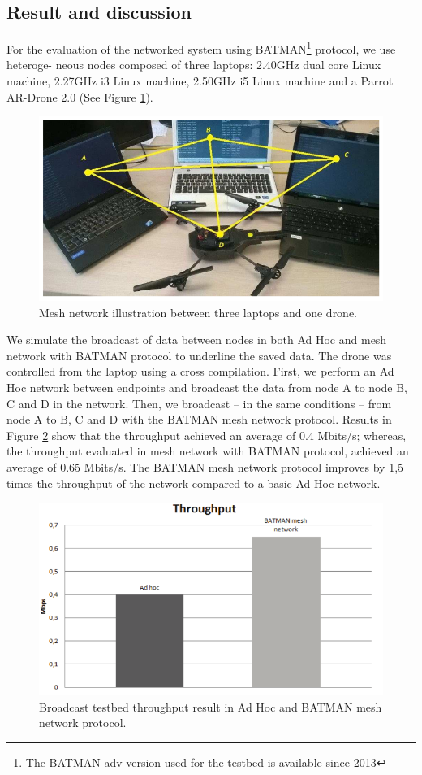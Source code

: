 \documentclass[11pt,openany]{book}
\begin{document}
\begin{algorimth}[H]
\subsection{Result and discussion}
For the evaluation of the networked system using BATMAN\footnote{The BATMAN-adv version used for the testbed is available since 2013} protocol, we use heteroge- neous nodes composed of three laptops: 2.40GHz dual core Linux machine, 2.27GHz i3 Linux machine, 2.50GHz i5 Linux machine and a Parrot AR-Drone 2.0 (See Figure \ref{fig:4.3}).
\begin{figure}[H]
    \centering
    \includegraphics[scale=0.3]{assets/4_3.png}
    \caption{Mesh network illustration between three laptops and one drone.}
    \label{fig:4.3}
\end{figure}
We simulate the broadcast of data between nodes in both Ad Hoc and mesh network with BATMAN protocol to underline the saved data. The drone was controlled from the laptop using a cross compilation. First, we perform an Ad Hoc network between endpoints and broadcast the data from node A to node B, C and D in the network. Then, we broadcast – in the same conditions – from node A to B, C and D with the BATMAN mesh network protocol. Results in Figure \ref{fig:4.4} show that the throughput achieved an average of 0.4 Mbits/s; whereas, the throughput evaluated in mesh network with BATMAN protocol, achieved an average of 0.65 Mbits/s. The BATMAN mesh network protocol improves by 1,5 times the throughput of the network compared to a basic Ad Hoc network.
\begin{figure}[H]
    \centering
    \includegraphics[scale=0.4]{assets/4_4.png}
    \caption{Broadcast testbed throughput result in Ad Hoc and BATMAN mesh network protocol.}
    \label{fig:4.4}
\end{figure}

\end{algorimth}
\end{document}
